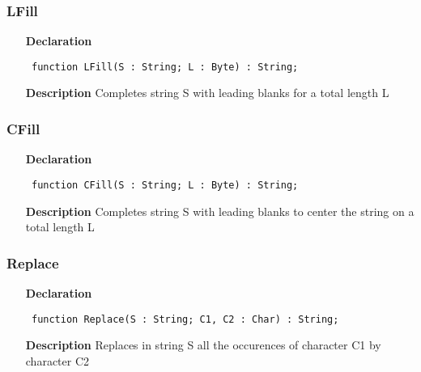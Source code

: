 \documentclass[12pt,a4paper,oneside]{report}
\newcommand{\declarationitem}[1]{\textbf{#1}}
\newcommand{\descriptiontitle}[1]{\textbf{#1}}
\newcommand{\code}[1]{\texttt{#1}}
\begin{document}
\subsubsection{LFill}
\label{ustrings-LFill}
\begin{itemize}\item[\declarationitem{Declaration}\hfill]
	\begin{flushleft}
		\code{
			function LFill(S : String; L : Byte) : String;}
		
	\end{flushleft}
	
	\par
	\item[\descriptiontitle{Description}]
	Completes string S with leading blanks for a total length L
	
\end{itemize}
\subsubsection{CFill}
\label{ustrings-CFill}
\begin{itemize}\item[\declarationitem{Declaration}\hfill]
	\begin{flushleft}
		\code{
			function CFill(S : String; L : Byte) : String;}
		
	\end{flushleft}
	
	\par
	\item[\descriptiontitle{Description}]
	Completes string S with leading blanks to center the string on a total length L
	
\end{itemize}
\subsubsection{Replace}
\label{ustrings-Replace}
\begin{itemize}\item[\declarationitem{Declaration}\hfill]
	\begin{flushleft}
		\code{
			function Replace(S : String; C1, C2 : Char) : String;}
		
	\end{flushleft}
	
	\par
	\item[\descriptiontitle{Description}]
	Replaces in string S all the occurences of character C1 by character C2
	
\end{itemize}
\end{document}
